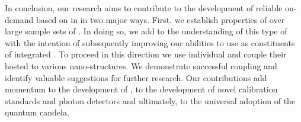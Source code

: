    In conclusion, our research aims to contribute to the development of reliable on-demand \spss based on \sivs in \nds in two major ways. First, we establish properties of \sivs over large sample sets of \nds. In doing so, we add to the understanding of this type of \cc with the intention of subsequently improving our abilities to use \sivs as constituents of integrated \spss. To proceed in this direction we use individual \nds and couple their hosted \sivs to various nano-structures. We demonstrate successful coupling and identify valuable suggestions for further research.
   Our contributions add momentum to the development of \spss, to the development of novel calibration standards and photon detectors and ultimately, to the universal adoption of the quantum candela.
